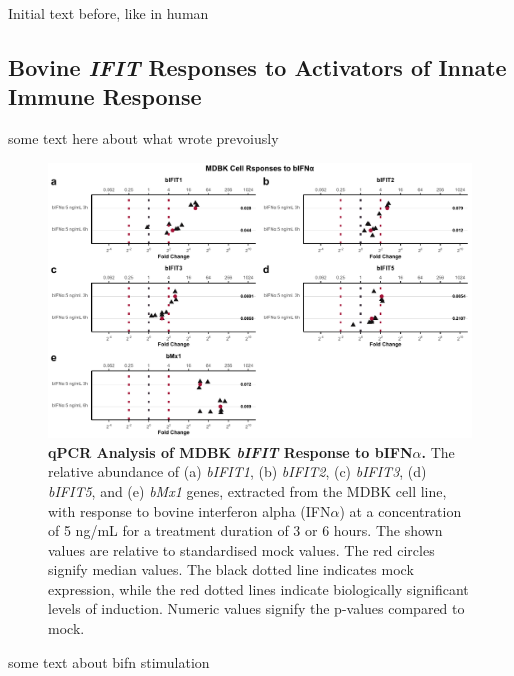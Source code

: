 Initial text before, like in human



\subsection{Bovine \textit{IFIT} Responses to Activators of Innate Immune Response} \label{subsec:Bovine IFIT Responses to Activators of Innate Immune Response}
some text here about what wrote prevoiusly



\begin{figure}
    \centering
    \includegraphics[width=1\linewidth]{07. Chapter 2/Figs/02. Induction/01. mdbk_treat_bifna.pdf}
    \caption[qPCR Analysis of MDBK \textit{bIFIT} Response to bIFN\(\alpha\).]{\textbf{qPCR Analysis of MDBK \textit{bIFIT} Response to bIFN\(\alpha\).} The relative abundance of (a) \textit{bIFIT1}, (b) \textit{bIFIT2}, (c) \textit{bIFIT3}, (d) \textit{bIFIT5}, and (e) \textit{bMx1} genes, extracted from the MDBK cell line, with response to bovine interferon alpha (IFN\(\alpha\)) at a concentration of 5 ng/mL for a treatment duration of 3 or 6 hours. The shown values are relative to standardised mock values. The red circles signify median values. The black dotted line indicates mock expression, while the red dotted lines indicate biologically significant levels of induction. Numeric values signify the p-values compared to mock.}
    \label{fig:MDBK responses to bIFNa}
\end{figure}


some text about bifn stimulation

